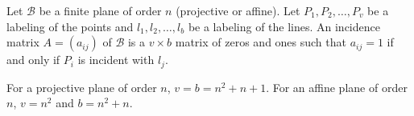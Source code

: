Let $\mathcal{B}$ be a finite plane of order $n$ (projective or affine). Let $P_1, P_2, \dots, P_v$ be a labeling of the points and $l_1, l_2, \dots, l_b$ be a labeling of the lines. An incidence matrix $A = (a_{ij})$ of $\mathcal{B}$ is a $v \times b$ matrix of zeros and ones such that $a_{ij} = 1$ if and only if $P_i$ is incident with $l_j$.

For a projective plane of order $n$, $v = b = n^2 + n + 1$. For an affine plane of order $n$, $v = n^2$ and $b = n^2 + n$.
